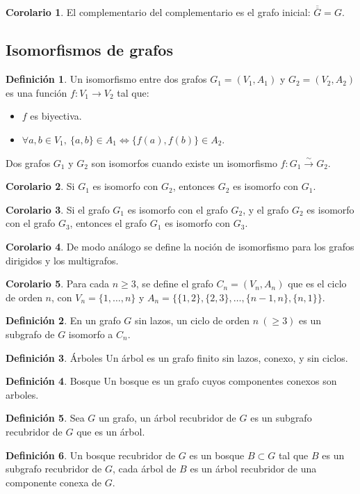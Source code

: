 \documentclass[10pt]{article}
\theoremstyle{definition}
\newtheorem{definition}{Definición}[section]
\newtheorem{corollary}{Corolario}[theorem]
\begin{document}
    \begin{corollary}
        El complementario del complementario es el grafo inicial: $\overline{\overline{G}}=G$.
    \end{corollary}
    \newpage\subsection{Isomorfismos de grafos}
    \begin{definition}
        Un isomorfismo entre dos grafos $G_1=(V_1,A_1)$ y $G_2=(V_2,A_2)$ es una función $f:V_1\to V_2$ tal que:
        \begin{itemize}
            \item $f$ es biyectiva.
            \item $\forall a,b\in V_1,\ \{a,b\}\in A_1\Leftrightarrow\{f(a),f(b)\}\in A_2$.
        \end{itemize}
        Dos grafos $G_1$ y $G_2$ son isomorfos cuando existe un isomorfismo $f:G_1\xrightarrow{\sim} G_2$.
    \end{definition}
    \begin{corollary}
        Si $G_1$ es isomorfo con $G_2$, entonces $G_2$ es isomorfo con $G_1$.
    \end{corollary}
    \begin{corollary}
        Si el grafo $G_1$ es isomorfo con el grafo $G_2$, y el grafo $G_2$ es isomorfo con el grafo $G_3$, entonces el grafo $G_1$ es isomorfo con $G_3$.
    \end{corollary}
    \begin{corollary}
        De modo análogo se define la noción de isomorfismo para los grafos dirigidos y los multigrafos.
    \end{corollary}
    \begin{corollary}
        Para cada $n\ge 3$, se define el grafo $C_n=(V_n,A_n)$ que es el ciclo de orden $n$, con $V_n=\{1,\dots,n\}$ y $A_n=\{\{1,2\},\{2,3\},\dots,\{n-1,n\},\{n,1\}\}$.
    \end{corollary}
    \begin{definition}
        En un grafo $G$ sin lazos, un ciclo de orden $n\ (\ge 3)$ es un subgrafo de $G$ isomorfo a $C_n$.
    \end{definition}
    \begin{definition}{Árboles}
       Un árbol es un grafo finito sin lazos, conexo, y sin ciclos. 
    \end{definition}
    \begin{definition}{Bosque}
        Un bosque es un grafo cuyos componentes conexos son arboles.
    \end{definition}
    \begin{definition}
        Sea $G$ un grafo, un árbol recubridor de $G$ es un subgrafo recubridor de $G$ que es un árbol.
    \end{definition}
    \begin{definition}
        Un bosque recubridor de $G$ es un bosque $B\subset G$ tal que $B$ es un subgrafo recubridor de $G$, cada árbol de $B$ es un árbol recubridor de una componente conexa de $G$.
    \end{definition}
\end{document}
